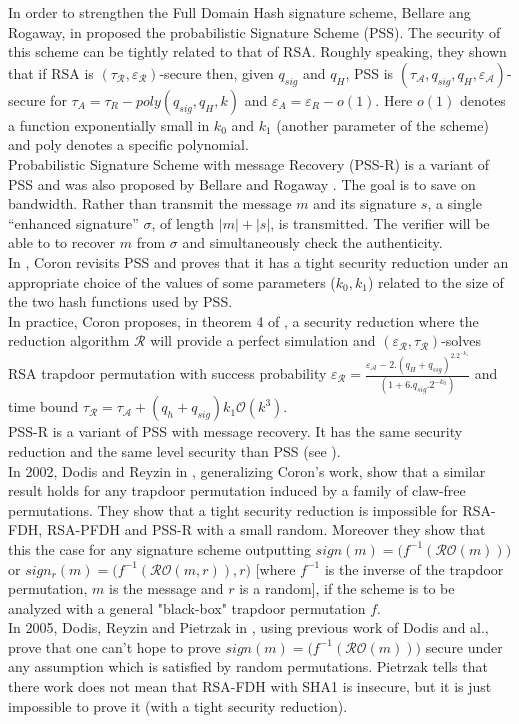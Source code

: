 \documentclass[a4paper,11pt]{article}
\begin{document}
In order to strengthen the Full Domain Hash signature scheme, Bellare ang Rogaway, in \cite{Bellare2} proposed the probabilistic Signature Scheme (PSS). The security of this scheme can be tightly related to that of RSA. Roughly speaking, they shown that if RSA is $(\tau_\mathcal{R},\varepsilon_\mathcal{R})$-secure then, given $q_{sig}$ and $q_H$, PSS is $(\tau_\mathcal{A},q_{sig},q_{H},\varepsilon_\mathcal{A})$-secure for $\tau_{A}=\tau_{R}-poly(q_{sig},q_{H},k)$ and $\varepsilon_{A}=\varepsilon_{R}-o(1)$. Here $o(1)$ denotes a function exponentially small in $k_0$ and $k_1$ (another parameter of the scheme) and poly denotes a specific polynomial.\\
Probabilistic Signature Scheme with message Recovery (PSS-R) is a variant of PSS and was also proposed by Bellare and Rogaway \cite{Bellare2}.  The goal is to save on bandwidth. Rather than transmit the message $m$ and its signature $s$, a single ``enhanced signature'' $\sigma$, of length $|m|+|s|$, is transmitted. The verifier will be able to to recover $m$ from $\sigma$ and simultaneously check the authenticity.\\
In \cite{Coron-GHR-PSS}, Coron revisits PSS and proves that it has a  tight security reduction under an appropriate choice of the values of some parameters ($k_{0}, k_{1}$) related to the size of the two hash functions used by PSS.\\
In practice, Coron proposes, in theorem 4 of \cite{Coron-GHR-PSS}, a security reduction where the reduction algorithm  $\mathcal{R}$ will provide a perfect simulation and $(\varepsilon_{\mathcal{R}}, \tau_{\mathcal{R}})$-solves RSA trapdoor permutation with success probability $\varepsilon_\mathcal{R}=\frac{\varepsilon_\mathcal{A}-2.(q_H+q_{sig})^2.2^{-k_1}}{(1+6.q_{sig}.2^{-k_0})}$ and time bound $\tau_{\mathcal{R}}= \tau_{\mathcal{A}} + (q_{h}+q_{sig})k_{1}\mathcal{O}(k^{3})$. \\
PSS-R is a variant of PSS with message recovery. It has the same security reduction and the same level security than PSS (see \cite{Coron-GHR-PSS}).\\
In 2002, Dodis and Reyzin in \cite{Dodis}, generalizing Coron's work, show that a similar result holds for any trapdoor
 permutation induced by a family of claw-free permutations. They show that a tight security reduction is impossible for RSA-FDH, RSA-PFDH and PSS-R with a small random. Moreover they show that this the case for any signature scheme outputting $sign(m)=\big(f^{-1}(\mathcal{RO}(m))\big)$ or $sign_{r}(m)=\big(f^{-1}(\mathcal{RO}(m, r)), r\big)$ [where $f^{-1}$ is the inverse of the trapdoor permutation, $m$ is the message and $r$ is a random], if the scheme is to be analyzed with a general "black-box" trapdoor permutation $f$.\\
In 2005, Dodis, Reyzin and Pietrzak in \cite{Dodis2},  using previous work of Dodis and al., prove that one can't hope to prove  $sign(m)=\big(f^{-1}(\mathcal{RO}(m))\big)$ secure under any assumption which is satisfied by random permutations. Pietrzak tells that there work does not mean that  RSA-FDH with SHA1  is insecure,  but it is just impossible to prove it (with a tight security reduction).\\
\end{document}
